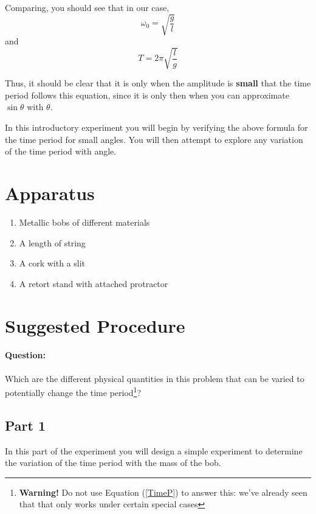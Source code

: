 Comparing, you should see that in our case, $$\omega_0 = \sqrt{\frac{g}{l}}$$ and $$T = 2\pi \sqrt{\frac{l}{g}}$$

Thus, it should be clear that it is only when the amplitude is \textbf{small} that the time period follows this equation, since it is only then when you can approximate $\sin\theta$ with $\theta$.

In this introductory experiment you will begin by verifying the above formula for the time period for small angles. You will then attempt to explore any variation of the time period with angle.

\section{Apparatus}

\begin{enumerate}
    \item Metallic bobs of different materials
    \item A length of string
    \item A cork with a slit
    \item A retort stand with attached protractor
\end{enumerate}

\section{Suggested Procedure}

\begin{question} 
\paragraph{Question:} Which are the different physical quantities in this problem that can be varied to potentially change the time period\footnote{\textbf{Warning!} Do not use Equation (\ref{TimeP}) to answer this: we've already seen that that only works under certain special cases}?
\end{question}

\subsection{Part 1}

In this part of the experiment you will design a simple experiment to determine the variation of the time period with the mass of the bob.


